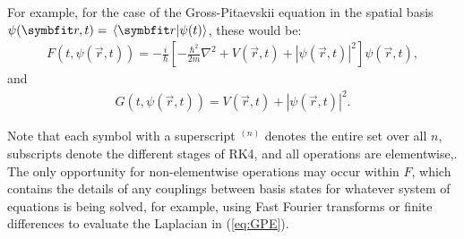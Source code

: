 For example, for the case of the Gross-Pitaevskii equation in the spatial basis $\psi(\vec r, t) = \braket{\vec r}{\psi(t)}$, these would be:
\begin{align}\label{eq:GPE}
F(t, \psi(\vec r, t)) = -\frac i \hbar\left[-\frac{\hbar^2}{2m}\nabla^2 + V(\vec r, t) + |\psi(\vec r, t)|^2\right]\psi(\vec r, t),
\end{align}
and
\begin{align}
G(t, \psi(\vec r, t)) = V(\vec r, t) + |\psi(\vec r, t)|^2.
\end{align}

Note that each symbol with a superscript $^{(n)}$ denotes the entire set over all $n$, subscripts denote the different stages of RK4, and all operations are elementwise,. The only opportunity for non-elementwise operations may occur within $F$, which contains the details of any couplings between basis states for whatever system of equations is being solved, for example, using Fast Fourier transforms or finite differences to evaluate the Laplacian in (\ref{eq:GPE}).


